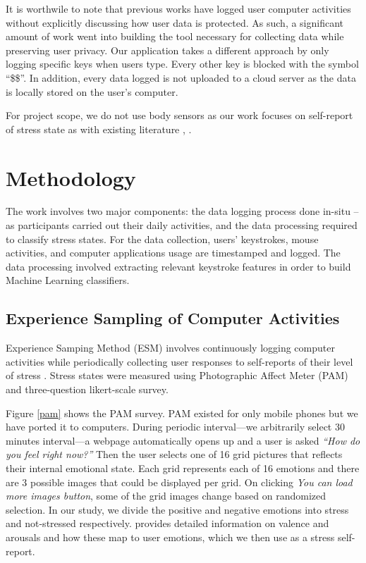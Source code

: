 \documentclass{article}
\begin{document}
It is worthwile to note that previous works have logged user computer activities without explicitly discussing how user data is protected. As such, a significant amount of work went into building the tool necessary for collecting data while preserving user privacy. Our application takes a different approach by only logging specific keys when users type. Every other key is blocked with the symbol ``\$\$''. In addition, every data logged is not uploaded to a cloud server as the data is locally stored on the user's computer. 

For project scope, we do not use body sensors as our work focuses on self-report of stress state as with existing literature \cite{epp2011identifying}, \cite{wang2014studentlife}.
\section{Methodology}
The work involves two major components: the data logging process done in-situ -- as participants carried out their daily activities, and the data processing required to classify stress states. For the data collection, users' keystrokes, mouse activities, and computer applications usage are timestamped and logged. The data processing involved extracting relevant keystroke features in order to build Machine Learning classifiers. 

\subsection{Experience Sampling of Computer Activities}
Experience Samping Method (ESM) involves continuously logging computer activities while periodically collecting user responses to self-reports of their level of stress \cite{hektner2007experience}. Stress states were measured using Photographic Affect Meter (PAM) \cite{pollak2011pam}and three-question likert-scale survey. 

Figure \ref{pam} shows the PAM survey. PAM existed for only mobile phones but we have ported it to computers. During periodic interval---we arbitrarily select 30 minutes interval---a webpage automatically opens up and a user is asked \textit{``How do you feel right now?''} Then the user selects one of 16 grid pictures that reflects their internal emotional state. Each grid represents each of 16 emotions and there are 3 possible images that could be displayed per grid.  On clicking \textit{You can load more images button}, some of the grid images change based on randomized selection. In our study, we divide the positive and negative emotions into stress and not-stressed respectively. \cite{pollak2011pam} provides detailed information on valence and arousals and how these map to user emotions, which we then use as a stress self-report.
\end{document}

